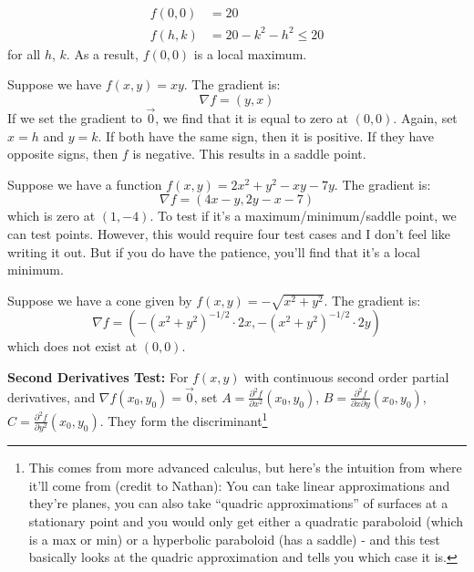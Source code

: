 \begin{itemize}
\begin{definition}
        \begin{align}
            f(0,0) &= 20 \\ 
            f(h,k) &= 20-k^2-h^2 \le 20
        \end{align}
        for all $h$, $k$. As a result, $f(0,0)$ is a local maximum.
    \end{definition}
    \begin{example}
        Suppose we have $f(x,y) = xy$. The gradient is:
        \begin{equation}
            \nabla f = (y, x)
        \end{equation}
        If we set the gradient to $\vec{0}$, we find that it is equal to zero at $(0,0)$. Again, set $x=h$ and $y=k$. If both have the same sign, then it is positive. If they have opposite signs, then $f$ is negative. This results in a saddle point.
    \end{example}
    \begin{example}
        Suppose we have a function $f(x,y) = 2x^2 + y^2 - xy - 7y$. The gradient is:
        \begin{equation}
            \nabla f = (4x-y, 2y-x-7)
        \end{equation}
        which is zero at $(1,-4)$. To test if it's a maximum/minimum/saddle point, we can test points. However, this would require four test cases and I don't feel like writing it out. But if you do have the patience, you'll find that it's a local minimum.
    \end{example}
    \begin{example}
        Suppose we have a cone given by $f(x,y)=-\sqrt{x^2+y^2}$. The gradient is:
        \begin{equation}
            \nabla f = (-(x^2+y^2)^{-1/2} \cdot 2x, -(x^2+y^2)^{-1/2} \cdot 2y)
        \end{equation}
        which does not exist at $(0,0)$.
    \end{example}
    \begin{theorem}
        \textbf{Second Derivatives Test:} For $f(x,y)$ with continuous second order partial derivatives, and $\nabla f(x_0, y_0) = \vec{0}$, set $A = \frac{\partial^2 f}{\partial x^2}(x_0, y_0)$, $B=\frac{\partial^2 f}{\partial x\partial y}(x_0,y_0)$, $C=\frac{\partial^2 f}{\partial y^2}(x_0,y_0)$. They form the discriminant\footnote{This comes from more advanced calculus, but here's the intuition from where it'll come from (credit to Nathan): You can take linear approximations and they're planes, you can also take ``quadric approximations'' of surfaces at a stationary point and you would only get either a quadratic paraboloid (which is a max or min) or a hyperbolic paraboloid (has a saddle) - and this test basically looks at the quadric approximation and tells you which case it is.
}
\end{theorem}
\end{itemize}
